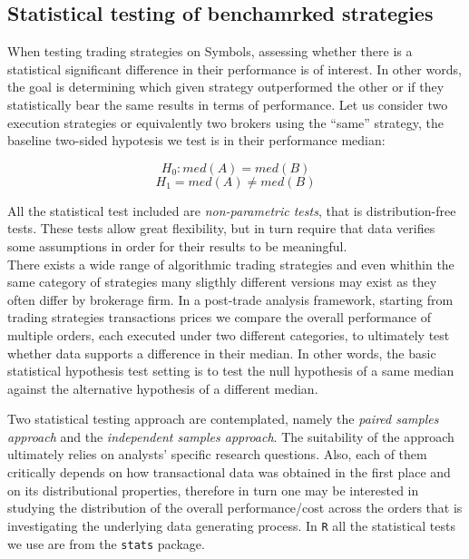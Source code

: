\hypertarget{statistical-testing-of-benchamrked-strategies}{%
\subsection{Statistical testing of benchamrked
strategies}\label{statistical-testing-of-benchamrked-strategies}}

When testing trading strategies on Symbols, assessing whether there is a
statistical significant difference in their performance is of interest.
In other words, the goal is determining which given strategy
outperformed the other or if they statistically bear the same results in
terms of performance. Let us consider two execution strategies or
equivalently two brokers using the ``same'' strategy, the baseline
two-sided hypotesis we test is in their performance median:

\[ H_{0}: med(A) = med(B) \] \[ H_{1} = med(A) \neq med(B) \]

All the statistical test included are \emph{non-parametric tests}, that
is distribution-free tests. These tests allow great flexibility, but in
turn require that data verifies some assumptions in order for their
results to be meaningful.\\
There exists a wide range of algorithmic trading strategies and even
whithin the same category of strategies many sligthly different versions
may exist as they often differ by brokerage firm. In a post-trade
analysis framework, starting from trading strategies transactions prices
we compare the overall performance of multiple orders, each executed
under two different categories, to ultimately test whether data supports
a difference in their median. In other words, the basic statistical
hypothesis test setting is to test the null hypothesis of a same median
against the alternative hypothesis of a different median.

Two statistical testing approach are contemplated, namely the
\emph{paired samples approach} and the
\emph{independent samples approach}. The suitability of the approach
ultimately relies on analysts' specific research questions. Also, each
of them critically depends on how transactional data was obtained in the
first place and on its distributional properties, therefore in turn one
may be interested in studying the distribution of the overall
performance/cost across the orders that is investigating the underlying
data generating process. In \texttt{R} all the statistical tests we use
are from the \texttt{stats} package.

